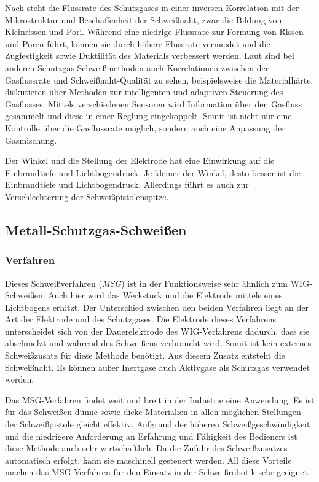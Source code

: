 Nach \textcite[499-503]{Abbasi2018} steht die Flussrate des Schutzgases in einer inversen Korrelation mit der Mikrostruktur und Beschaffenheit der Schweißnaht, zwar die Bildung von Kleinrissen und Pori. Während eine niedrige Flussrate zur Formung von Rissen und Poren führt, können sie durch höhere Flussrate vermeidet und die Zugfestigkeit sowie Duktilität des Materials verbessert werden. Laut \textcite{Tesfaw2022} sind bei anderen Schutzgas-Schweißmethoden auch Korrelationen zwischen der Gasflussrate und Schweißnaht-Qualität zu sehen, beispielsweise die Materialhärte. \textcite{Mvola2017} diskutieren über Methoden zur intelligenten und adaptiven Steuerung des Gasflusses. Mittels verschiedenen Sensoren wird Information über den Gasfluss gesammelt und diese in einer Reglung eingekoppelt. Somit ist nicht nur eine Kontrolle über die Gasflussrate möglich, sondern auch eine Anpassung der Gasmischung.

Der Winkel und die Stellung der Elektrode hat eine Einwirkung auf die Einbrandtiefe und Lichtbogendruck. Je kleiner der Winkel, desto besser ist die Einbrandtiefe und Lichtbogendruck. Allerdings führt es auch zur Verschlechterung der Schweißpistolenspitze. \autocite[34]{Pires_WeldingRobots_2006}

\subsection{Metall-Schutzgas-Schweißen}
\subsubsection{Verfahren}
Dieses Schweißverfahren (\emph{MSG}) ist in der Funktionsweise sehr ähnlich zum WIG-Schweißen. Auch hier wird das Werkstück und die Elektrode mittels eines Lichtbogens erhitzt. Der Unterschied zwischen den beiden Verfahren liegt an der Art der Elektrode und des Schutzgases. Die Elektrode dieses Verfahrens unterscheidet sich von der Dauerelektrode des WIG-Verfahrens dadurch, dass sie abschmelzt und während des Schweißens verbraucht wird. Somit ist kein externes Schweißzusatz für diese Methode benötigt. Aus diesem Zusatz entsteht die Schweißnaht. Es können außer Inertgase auch Aktivgase als Schutzgas verwendet werden. \autocite[36]{Pires_WeldingRobots_2006}

Das MSG-Verfahren findet weit und breit in der Industrie eine Anwendung. Es ist für das Schweißen dünne sowie dicke Materialien in allen möglichen Stellungen der Schweißpistole gleicht effektiv. Aufgrund der höheren Schweißgeschwindigkeit und die niedrigere Anforderung an Erfahrung und Fähigkeit des Bedieners ist diese Methode auch sehr wirtschaftlich. Da die Zufuhr des Schweißzusatzes automatisch erfolgt, kann sie maschinell gesteuert werden. All diese Vorteile machen das MSG-Verfahren für den Einsatz in der Schweißrobotik sehr geeignet. \autocite[37]{Pires_WeldingRobots_2006}

